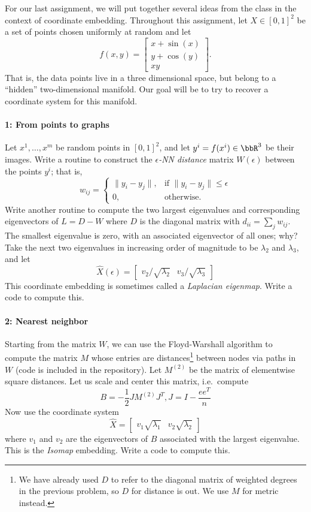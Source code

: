 \documentclass[12pt, leqno]{article} %
\begin{document}

For our last assignment, we will put together several ideas from the
class in the context of coordinate embedding.  Throughout this
assignment, let $X \in [0,1]^2$ be a set of points chosen uniformly at
random and let
\[
f(x,y) = \begin{bmatrix}
  x + \sin(x) \\
  y + \cos(y) \\
  xy
  \end{bmatrix}.
\]
That is, the data points live in a three dimensional space, but belong
to a ``hidden'' two-dimensional manifold.  Our goal will be to try to
recover a coordinate system for this manifold.

\paragraph*{1: From points to graphs}
Let $x^1, \ldots, x^m$ be random points in $[0,1]^2$, and let
$y^i = f(x^i) \in \bbR^3$ be their images.
Write a routine to construct the {\em $\epsilon$-NN distance} matrix
$W(\epsilon)$ between the points $y^i$; that is,
\[
  w_{ij} =
  \begin{cases}
    \|y_i-y_j\|, & \mbox{if } \|y_i-y_j\| \leq \epsilon \\
    0, & \mbox{otherwise}.
  \end{cases}
\]
Write another routine to compute the two largest eigenvalues and
corresponding eigenvectors of $L = D-W$ where $D$ is the diagonal
matrix with $d_{ii} = \sum_j w_{ij}$.  The smallest eigenvalue is
zero, with an associated eigenvector of all ones; why?  Take the
next two eigenvalues in increasing order of magnitude to be
$\lambda_2$ and $\lambda_3$, and let
\[
  \hat{X}(\epsilon) =
  \begin{bmatrix}
    v_2 / \sqrt{\lambda_2} &
    v_3 / \sqrt{\lambda_3}
  \end{bmatrix}
\]
This coordinate embedding is sometimes called a {\em Laplacian eigenmap}.
Write a code to compute this.

\paragraph*{2: Nearest neighbor}
Starting from the matrix $W$, we can use the Floyd-Warshall algorithm
to compute the matrix $M$ whose entries are distances\footnote{%
  We have already used $D$ to refer to the diagonal matrix of weighted
  degrees in the previous problem, so $D$ for distance is out.  We use
  $M$ for metric instead.
}
between nodes via paths in $W$ (code is included in the repository).
Let $M^{(2)}$ be the matrix of elementwise square distances.  Let us
scale and center this matrix, i.e.~compute
\[
  B = -\frac{1}{2} J M^{(2)} J^T, J = I-\frac{ee^T}{n}
\]
Now use the coordinate system
\[
  \hat{X} =
  \begin{bmatrix}
    v_1 \sqrt{\lambda_1} &
    v_2 \sqrt{\lambda_2}
  \end{bmatrix}
\]
where $v_1$ and $v_2$ are the eigenvectors of $B$ associated with the
largest eigenvalue.  This is the {\em Isomap} embedding.
Write a code to compute this.
\end{document}
